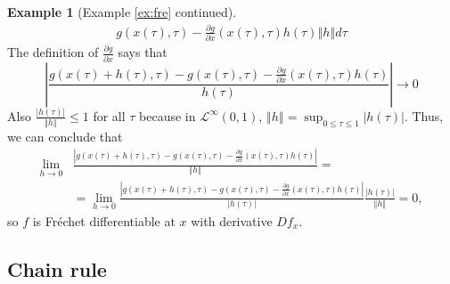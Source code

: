 \documentclass[12pt,reqno]{amsart}
\theoremstyle{definition}
\newtheorem*{example*}{Example}
\newcommand{\norm}[1]{\left\Vert {#1} \right\Vert}
\newcommand{\abs}[1]{\left\vert {#1} \right\vert}
\renewcommand{\to}{{\rightarrow}}
\begin{document}
\begin{example*}[Example \ref{ex:fre} continued]
\begin{align*}
{{        g(x(\tau),\tau) - \frac{\partial g}{\partial x}(x(\tau),\tau)
        h(\tau)} } {\norm{h}} d\tau 
  \end{align*}
  The definition of $\frac{\partial g}{\partial x}$ says that
  \[ \abs{\frac{ g(x(\tau) + h(\tau), \tau) -
      g(x(\tau),\tau) - \frac{\partial g}{\partial x}(x(\tau),\tau)
      h(\tau)}{h(\tau)}} \to 0 \]
  Also $\frac{\abs{h(\tau)}}{\norm{h}} \leq 1$ for all $\tau$ because
  in $\mathcal{L}^\infty(0,1)$, $\norm{h} = \sup_{0 \leq \tau \leq 1}
  \abs{h(\tau)}$. Thus, we can conclude that
  \begin{align*}
    \lim_{h \to 0} & \frac{ \abs{ g(x(\tau) + h(\tau), \tau) -
        g(x(\tau),\tau) - \frac{\partial g}{\partial x}(x(\tau),\tau)
        h(\tau)} } {\norm{h}}
    = \\ 
    & = \lim_{h \to 0} \frac{ \abs{ g(x(\tau) + h(\tau), \tau) -
        g(x(\tau),\tau) - \frac{\partial g}{\partial x}(x(\tau),\tau)
        h(\tau)} } {\abs{h(\tau)}} \frac{\abs{h(\tau)}} {\norm{h}}  
    = 0,
  \end{align*}
  so $f$ is Fr\'{e}chet differentiable at $x$ with derivative $Df_x$. 
\end{example*}


\subsection{Chain rule}
\end{document}
